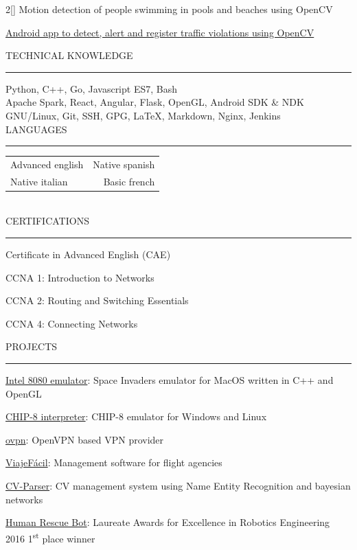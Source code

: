 \documentclass[a4paper, 12pt]{article}
\newenvironment{myparacol}[2][]{%
\begin{paracol}{#2}[#1]\setlength{\parindent}{0pt}}{%
\end{paracol}}
\begin{document}
\begin{sloppypar}
\begin{myparacol}{2}
    Motion detection of people swimming in pools and beaches using OpenCV

    \href{https://github.com/hugo19941994/infrac-coche}{Android app to detect, alert and register traffic violations using OpenCV}
    \\

    \switchcolumn

    TECHNICAL KNOWLEDGE
    \vspace{1mm}
    \hrule
    \kern9pt

    Python, C++, Go, Javascript ES7, Bash\\

    Apache Spark, React, Angular, Flask, OpenGL, Android SDK \& NDK\\

    GNU/Linux, Git, SSH, GPG, \LaTeX, Markdown, Nginx, Jenkins\\

    LANGUAGES
    \vspace{1mm}
    \hrule
    \kern9pt
    \noindent\begin{tabular}{ @{} l r }
        Advanced english & Native spanish\\
        Native italian & Basic french\\
    \end{tabular}
    \\

    CERTIFICATIONS
    \vspace{1mm}
    \hrule
    \kern9pt
    Certificate in Advanced English (CAE)

    CCNA 1: Introduction to Networks

    CCNA 2: Routing and Switching Essentials

    CCNA 4: Connecting Networks

    \switchcolumn

    \noindent PROJECTS
    \vspace{1mm}
    \hrule
    \kern9pt
    \href{https://github.com/hugo19941994/SpaceInvaders-Emu}{Intel 8080 emulator}: Space Invaders emulator for MacOS written in C++ and OpenGL

    \href{https://github.com/hugo19941994/CHIP8-Emu}{CHIP-8 interpreter}: CHIP-8 emulator for Windows and Linux

    \href{https://vpn.hugofs.com}{ovpn}: OpenVPN based VPN provider

    \href{https://github.com/hugo19941994/ViajeFacil}{ViajeFácil}: Management software for flight agencies

    \href{https://github.com/hugo19941994/CV-Parser}{CV-Parser}: CV management system using Name Entity Recognition and bayesian networks

    \href{https://github.com/hugo19941994/robot}{Human Rescue Bot}: Laureate Awards for Excellence in Robotics Engineering 2016 1\textsuperscript{st} place winner

\end{myparacol}
\end{sloppypar}
\end{document}
